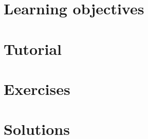 \documentclass[
]{book}
\begin{document}
\hypertarget{learning-objectives-11}{%
\section{Learning objectives}\label{learning-objectives-11}}

\hypertarget{tutorial-11}{%
\section{Tutorial}\label{tutorial-11}}

\hypertarget{exercises-11}{%
\section{Exercises}\label{exercises-11}}

\hypertarget{solutions-11}{%
\section{Solutions}\label{solutions-11}}

  
\end{document}
